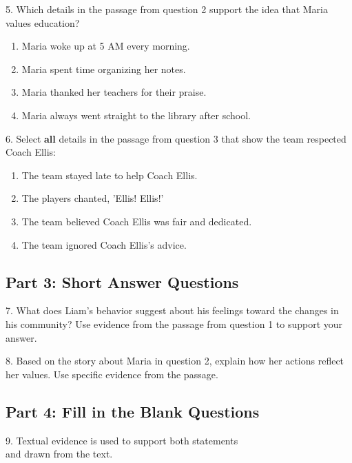 \documentclass[12pt]{article}
\begin{document}
\vspace{1cm}

5. Which details in the passage from question 2 support the idea that Maria values education?  
\begin{enumerate}[label=\Alph*.]
    \item Maria woke up at 5 AM every morning.  
    \item Maria spent time organizing her notes.  
    \item Maria thanked her teachers for their praise.  
    \item Maria always went straight to the library after school.  
\end{enumerate}

\vspace{1cm}

6. Select \textbf{all} details in the passage from question 3 that show the team respected Coach Ellis:  
\begin{enumerate}[label=\Alph*.]
    \item The team stayed late to help Coach Ellis.  
    \item The players chanted, 'Ellis! Ellis!'  
    \item The team believed Coach Ellis was fair and dedicated.  
    \item The team ignored Coach Ellis’s advice.  
\end{enumerate}
\newpage
\subsection*{Part 3: Short Answer Questions}

7. What does Liam’s behavior suggest about his feelings toward the changes in his community? Use evidence from the passage from question 1 to support your answer.  
\vspace{4cm}

8. Based on the story about Maria in question 2, explain how her actions reflect her values. Use specific evidence from the passage.  
\vspace{4cm}

\subsection*{Part 4: Fill in the Blank Questions}
\vspace{1cm}
9. Textual evidence is used to support both \underline{\hspace{4cm}} statements\\ and \underline{\hspace{4cm}} drawn from the text.  
\vspace{2cm}
\end{document}
